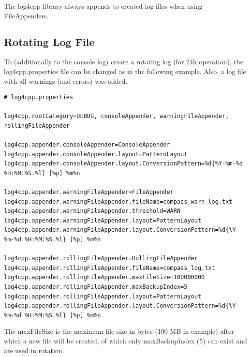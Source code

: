 The log4cpp library always appends to created log files when using FileAppenders.


\subsection{Rotating Log File}
\label{sec:appendix_logging_rotate}

To (additionally to the console log) create a rotating log (for 24h operation), the log4cpp.properties file can be changed as in the following example. Also, a log file with all warnings (and errors) was added.

\begin{lstlisting}
# log4cpp.properties

log4cpp.rootCategory=DEBUG, consoleAppender, warningFileAppender, rollingFileAppender

log4cpp.appender.consoleAppender=ConsoleAppender
log4cpp.appender.consoleAppender.layout=PatternLayout
log4cpp.appender.consoleAppender.layout.ConversionPattern=%d{%Y-%m-%d %H:%M:%S.%l} [%p] %m%n

log4cpp.appender.warningFileAppender=FileAppender
log4cpp.appender.warningFileAppender.fileName=compass_warn_log.txt
log4cpp.appender.warningFileAppender.threshold=WARN
log4cpp.appender.warningFileAppender.layout=PatternLayout
log4cpp.appender.warningFileAppender.layout.ConversionPattern=%d{%Y-%m-%d %H:%M:%S.%l} [%p] %m%n

log4cpp.appender.rollingFileAppender=RollingFileAppender
log4cpp.appender.rollingFileAppender.fileName=compass_log.txt
log4cpp.appender.rollingFileAppender.maxFileSize=100000000
log4cpp.appender.rollingFileAppender.maxBackupIndex=5
log4cpp.appender.rollingFileAppender.layout=PatternLayout
log4cpp.appender.rollingFileAppender.layout.ConversionPattern=%d{%Y-%m-%d %H:%M:%S.%l} [%p] %m%n
\end{lstlisting}

The maxFileSize is the maximum file size in bytes (100 MB in example) after which a new file will be created, of which only maxBackupIndex (5) can exist and are used in rotation.
